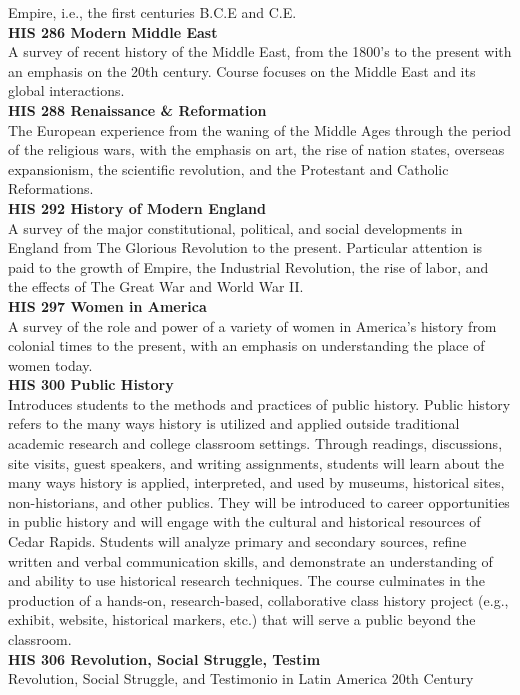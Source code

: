 \documentclass[
  letterpaper,
]{scrbook}
\begin{document}
Empire, i.e., the first centuries B.C.E and C.E.\\
\textbf{HIS 286 Modern Middle East}\\
A survey of recent history of the Middle East, from the 1800's to the
present with an emphasis on the 20th century. Course focuses on the
Middle East and its global interactions.\\
\textbf{HIS 288 Renaissance \& Reformation}\\
The European experience from the waning of the Middle Ages through the
period of the religious wars, with the emphasis on art, the rise of
nation states, overseas expansionism, the scientific revolution, and the
Protestant and Catholic Reformations.\\
\textbf{HIS 292 History of Modern England}\\
A survey of the major constitutional, political, and social developments
in England from The Glorious Revolution to the present. Particular
attention is paid to the growth of Empire, the Industrial Revolution,
the rise of labor, and the effects of The Great War and World War II.\\
\textbf{HIS 297 Women in America}\\
A survey of the role and power of a variety of women in America's
history from colonial times to the present, with an emphasis on
understanding the place of women today.\\
\textbf{HIS 300 Public History}\\
Introduces students to the methods and practices of public history.
Public history refers to the many ways history is utilized and applied
outside traditional academic research and college classroom settings.
Through readings, discussions, site visits, guest speakers, and writing
assignments, students will learn about the many ways history is applied,
interpreted, and used by museums, historical sites, non-historians, and
other publics. They will be introduced to career opportunities in public
history and will engage with the cultural and historical resources of
Cedar Rapids. Students will analyze primary and secondary sources,
refine written and verbal communication skills, and demonstrate an
understanding of and ability to use historical research techniques. The
course culminates in the production of a hands-on, research-based,
collaborative class history project (e.g., exhibit, website, historical
markers, etc.) that will serve a public beyond the classroom.\\
\textbf{HIS 306 Revolution, Social Struggle, Testim}\\
Revolution, Social Struggle, and Testimonio in Latin America 20th
Century
\end{document}
